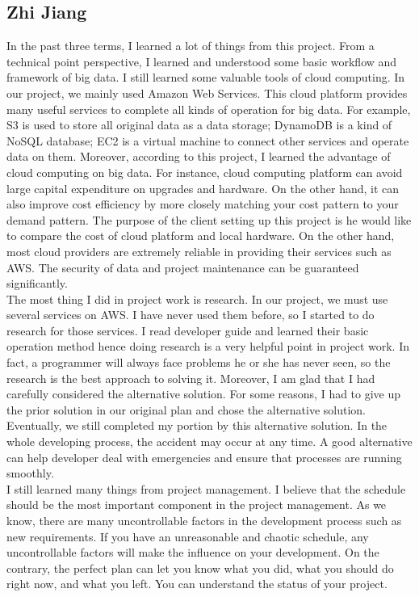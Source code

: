 \subsection{Zhi Jiang}
In the past three terms, I learned a lot of things from this project. From a technical point perspective, I learned and understood some basic workflow and framework of big data. I still learned some valuable tools of cloud computing. In our project, we mainly used Amazon Web Services. This cloud platform provides many useful services to complete all kinds of operation for big data. For example, S3 is used to store all original data as a data storage; DynamoDB is a kind of NoSQL database; EC2 is a virtual machine to connect other services and operate data on them. Moreover, according to this project, I learned the advantage of cloud computing on big data. For instance, cloud computing platform can avoid large capital expenditure on upgrades and hardware. On the other hand, it can also improve cost efficiency by more closely matching your cost pattern to your demand pattern. The purpose of the client setting up this project is he would like to compare the cost of cloud platform and local hardware. On the other hand, most cloud providers are extremely reliable in providing their services such as AWS. The security of data and project maintenance can be guaranteed significantly.\\ 

\noindent The most thing I did in project work is research. In our project, we must use several services on AWS. I have never used them before, so I started to do research for those services. I read developer guide and learned their basic operation method hence doing research is a very helpful point in project work. In fact, a programmer will always face problems he or she has never seen, so the research is the best approach to solving it. Moreover, I am glad that I had carefully considered the alternative solution. For some reasons, I had to give up the prior solution in our original plan and chose the alternative solution. Eventually, we still completed my portion by this alternative solution. In the whole developing process, the accident may occur at any time. A good alternative can help developer deal with emergencies and ensure that processes are running smoothly.\\

\noindent I still learned many things from project management. I believe that the schedule should be the most important component in the project management. As we know, there are many uncontrollable factors in the development process such as new requirements. If you have an unreasonable and chaotic schedule,  any uncontrollable factors will make the influence on your development. On the contrary, the perfect plan can let you know what you did, what you should do right now, and what you left. You can understand the status of your project.\\ 


